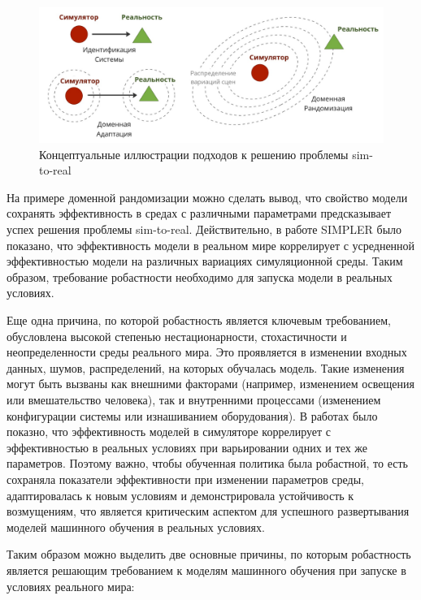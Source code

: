     \begin{figure}[!t]
      \centering
      \includegraphics[width=150mm]{images/sim2real.jpg}
      \caption{Концептуальные иллюстрации подходов к решению проблемы sim-to-real
      }
      \label{sim-to-real-app}
    \end{figure}

    На примере доменной рандомизации можно сделать вывод, что свойство модели сохранять эффективность в средах с различными параметрами предсказывает успех решения проблемы sim-to-real. Действительно, в работе SIMPLER \cite{li24simpler} было показано, что эффективность модели в реальном мире коррелирует с усредненной эффективностью модели на различных вариациях симуляционной среды. Таким образом, требование робастности необходимо для запуска модели в реальных условиях. 

    Еще одна причина, по которой робастность является ключевым требованием, обусловлена высокой степенью нестационарности, стохастичности и неопределенности среды реального мира. Это проявляется в изменении входных данных, шумов, распределений, на которых обучалась модель. Такие изменения могут быть вызваны как внешними факторами (например, изменением освещения или вмешательство человека), так и внутренними процессами (изменением конфигурации системы или изнашиванием оборудования). В работах \cite{li24simpler, pumacay2024colosseum} было показно, что эффективность моделей в симуляторе коррелирует с эффективностью в реальных условиях при варьировании одних и тех же параметров. Поэтому важно, чтобы обученная политика была робастной, то есть сохраняла показатели эффективности при изменении параметров среды, адаптировалась к новым условиям и демонстрировала устойчивость к возмущениям, что является критическим аспектом для успешного развертывания моделей машинного обучения в реальных условиях.

    Таким образом можно выделить две основные причины, по которым робастность является решающим требованием к моделям машинного обучения при запуске в условиях реального мира:

